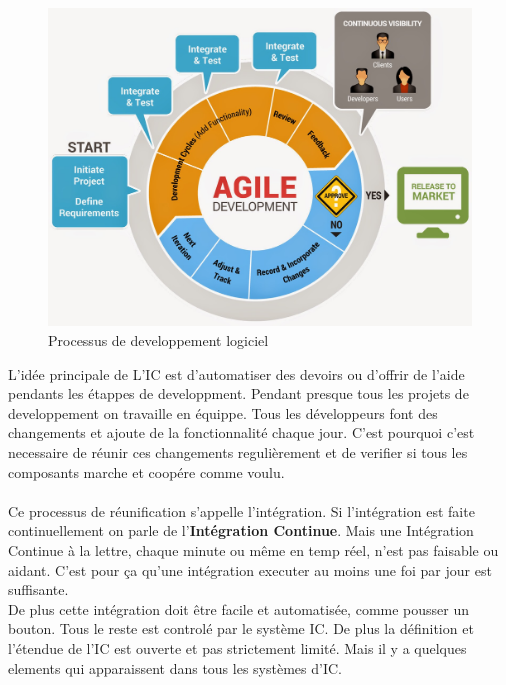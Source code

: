 \begin{figure}[H]
	\centering
		\includegraphics[scale=0.25]{bilder/agile_methodology}
	\caption{Processus de developpement logiciel}
	\label{fig:processus}
\end{figure}

L'idée principale de L'IC est d'automatiser des devoirs ou d'offrir de l'aide pendants les étappes de developpment. Pendant presque tous les projets de developpement on travaille en équippe. Tous les développeurs font des changements et ajoute de la fonctionnalité chaque jour. C'est pourquoi c'est necessaire de réunir ces changements regulièrement et de verifier si tous les composants marche et coopére comme voulu.\\\\
Ce processus de réunification s'appelle l'intégration. Si l'intégration est faite continuellement on parle de l'\textbf{Intégration Continue}. Mais une Intégration Continue à la lettre, chaque minute ou même en temp réel, n'est pas faisable ou aidant. C'est pour ça qu'une intégration executer au moins une foi par jour est suffisante.\\
De plus cette intégration doit être facile et automatisée, comme pousser un bouton. Tous le reste est controlé par le système IC. De plus la définition et l'étendue de l'IC est ouverte et pas strictement limité. Mais il y a quelques elements qui apparaissent dans tous les systèmes d'IC.
\newpage

